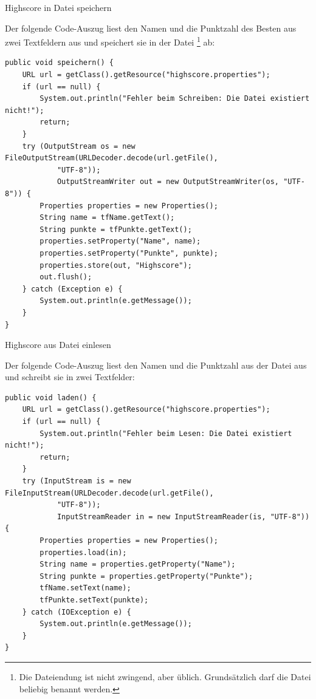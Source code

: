 \begin{compactenum}[a)]
\item Highscore in Datei speichern

Der folgende Code-Auszug liest den Namen und die Punktzahl des Besten aus zwei
Textfeldern aus und speichert sie in der Datei
\footnote{Die Dateiendung 
ist nicht zwingend, aber üblich. Grundsätzlich darf die Datei beliebig benannt
werden.} ab:

\begin{lstlisting}
public void speichern() {
    URL url = getClass().getResource("highscore.properties");
    if (url == null) {
        System.out.println("Fehler beim Schreiben: Die Datei existiert nicht!");
        return;
    }
    try (OutputStream os = new FileOutputStream(URLDecoder.decode(url.getFile(), 
	        "UTF-8"));
            OutputStreamWriter out = new OutputStreamWriter(os, "UTF-8")) {
        Properties properties = new Properties();
        String name = tfName.getText();
        String punkte = tfPunkte.getText();
        properties.setProperty("Name", name);
        properties.setProperty("Punkte", punkte);
        properties.store(out, "Highscore");
        out.flush();
    } catch (Exception e) {
        System.out.println(e.getMessage());
    }
}
\end{lstlisting}

\item Highscore aus Datei einlesen

Der folgende Code-Auszug liest den Namen und die Punktzahl aus der Datei
 aus und schreibt sie in zwei Textfelder:

\begin{lstlisting}
public void laden() {
    URL url = getClass().getResource("highscore.properties");
    if (url == null) {
        System.out.println("Fehler beim Lesen: Die Datei existiert nicht!");
        return;
    }
    try (InputStream is = new FileInputStream(URLDecoder.decode(url.getFile(), 
	        "UTF-8"));
            InputStreamReader in = new InputStreamReader(is, "UTF-8")) {
        Properties properties = new Properties();	
        properties.load(in);
        String name = properties.getProperty("Name");
        String punkte = properties.getProperty("Punkte");
        tfName.setText(name);
        tfPunkte.setText(punkte);
    } catch (IOException e) {
        System.out.println(e.getMessage());
    }
}
\end{lstlisting}
\end{compactenum}
